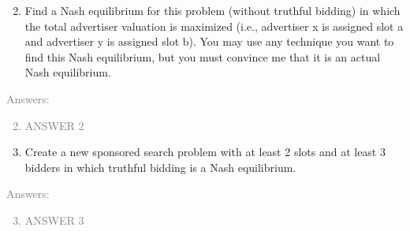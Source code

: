 \documentclass[11pt]{article}
\begin{document}
\begin{enumerate}
	\setcounter{enumi}{1}
	\item  Find a Nash equilibrium for this problem (without truthful bidding) in which the total advertiser valuation is maximized (i.e., advertiser x is assigned slot a and advertiser y is assigned slot b). You may use any technique you want to find this Nash equilibrium, but you must convince me that it is an actual Nash equilibrium.
\end{enumerate}
\textcolor{gray}{
Answers:
\begin{enumerate}
	\setcounter{enumi}{1}
	\item ANSWER 2 \\
\end{enumerate}
}	
\begin{enumerate}
	\setcounter{enumi}{2}
	\item Create a new sponsored search problem with at least 2 slots and at least 3 bidders in which truthful bidding is a Nash equilibrium.
\end{enumerate}
\textcolor{gray}{
Answers:
\begin{enumerate}
	\setcounter{enumi}{2}
	\item ANSWER 3 \\
\end{enumerate}
}
\end{document}
